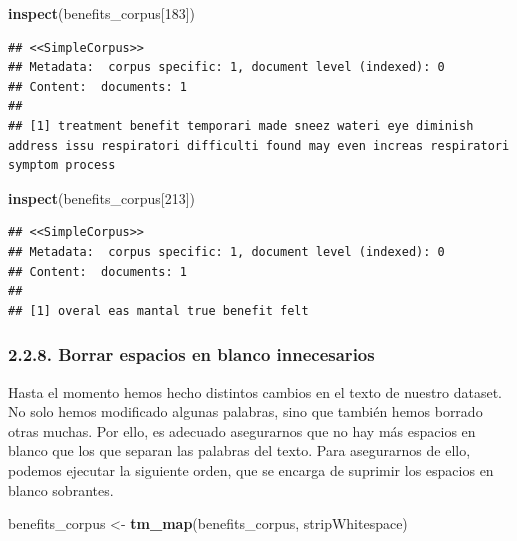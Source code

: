 \documentclass[spanish,]{article}
\newenvironment{Shaded}{\begin{snugshade}}{\end{snugshade}}
\newcommand{\DecValTok}[1]{\textcolor[rgb]{0.00,0.00,0.81}{#1}}
\newcommand{\KeywordTok}[1]{\textcolor[rgb]{0.13,0.29,0.53}{\textbf{#1}}}
\newcommand{\NormalTok}[1]{#1}
\newcommand{\StringTok}[1]{\textcolor[rgb]{0.31,0.60,0.02}{#1}}
\begin{document}
\begin{Shaded}
\begin{Highlighting}[]
\KeywordTok{inspect}\NormalTok{(benefits_corpus[}\DecValTok{183}\NormalTok{])}
\end{Highlighting}
\end{Shaded}

\begin{verbatim}
## <<SimpleCorpus>>
## Metadata:  corpus specific: 1, document level (indexed): 0
## Content:  documents: 1
## 
## [1] treatment benefit temporari made sneez wateri eye diminish address issu respiratori difficulti found may even increas respiratori symptom process
\end{verbatim}

\begin{Shaded}
\begin{Highlighting}[]
\KeywordTok{inspect}\NormalTok{(benefits_corpus[}\DecValTok{213}\NormalTok{])}
\end{Highlighting}
\end{Shaded}

\begin{verbatim}
## <<SimpleCorpus>>
## Metadata:  corpus specific: 1, document level (indexed): 0
## Content:  documents: 1
## 
## [1] overal eas mantal true benefit felt
\end{verbatim}

\hypertarget{borrar-espacios-en-blanco-innecesarios}{%
\subsubsection{2.2.8. Borrar espacios en blanco
innecesarios}\label{borrar-espacios-en-blanco-innecesarios}}

Hasta el momento hemos hecho distintos cambios en el texto de nuestro
dataset. No solo hemos modificado algunas palabras, sino que también
hemos borrado otras muchas. Por ello, es adecuado asegurarnos que no hay
más espacios en blanco que los que separan las palabras del texto. Para
asegurarnos de ello, podemos ejecutar la siguiente orden, que se encarga
de suprimir los espacios en blanco sobrantes.

\begin{Shaded}
\begin{Highlighting}[]
\NormalTok{benefits_corpus <-}\StringTok{ }\KeywordTok{tm_map}\NormalTok{(benefits_corpus, stripWhitespace) }
\end{Highlighting}
\end{Shaded}
\end{document}
